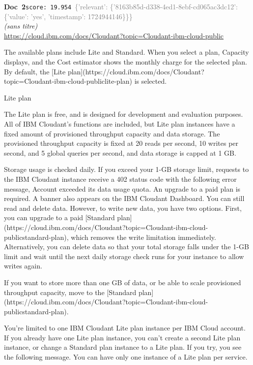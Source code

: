 \documentclass[a4paper,11pt]{article}
\begin{document}
\begin{docenv}
{\footnotesize\textcolor{doccolor}{\textbf{Doc~2}}}\hfill{\tiny\texttt{score:~19.954}}\ {\tiny\textcolor{gray}{\{'relevant': \{'8163b85d-d338-4ed1-8ebf-cd065ac3dc12': \{'value': 'yes', 'timestamp': 1724944146\}\}\}}}\\[3pt]
{\small\textit{(sans titre)}}\\[2pt]
{\tiny\url{https://cloud.ibm.com/docs/Cloudant?topic=Cloudant-ibm-cloud-public}}\\[4pt]
{\footnotesize 
The available plans include Lite and Standard. When you select a plan, Capacity displays, and the Cost estimator shows the monthly charge for the selected plan. By default, the [Lite plan](https://cloud.ibm.com/docs/Cloudant?topic=Cloudant-ibm-cloud-publiclite-plan) is selected.



 Lite plan 

The Lite plan is free, and is designed for development and evaluation purposes. All of IBM Cloudant's functions are included, but Lite plan instances have a fixed amount of provisioned throughput capacity and data storage. The provisioned throughput capacity is fixed at 20 reads per second, 10 writes per second, and 5 global queries per second, and data storage is capped at 1 GB.

Storage usage is checked daily. If you exceed your 1-GB storage limit, requests to the IBM Cloudant instance receive a 402 status code with the following error message, Account exceeded its data usage quota. An upgrade to a paid plan is required. A banner also appears on the IBM Cloudant Dashboard. You can still read and delete data. However, to write new data, you have two options. First, you can upgrade to a paid [Standard plan](https://cloud.ibm.com/docs/Cloudant?topic=Cloudant-ibm-cloud-publicstandard-plan), which removes the write limitation immediately. Alternatively, you can delete data so that your total storage falls under the 1-GB limit and wait until the next daily storage check runs for your instance to allow writes again.

If you want to store more than one GB of data, or be able to scale provisioned throughput capacity, move to the [Standard plan](https://cloud.ibm.com/docs/Cloudant?topic=Cloudant-ibm-cloud-publicstandard-plan).

You're limited to one IBM Cloudant Lite plan instance per IBM Cloud account. If you already have one Lite plan instance, you can't create a second Lite plan instance, or change a Standard plan instance to a Lite plan. If you try, you see the following message. You can have only one instance of a Lite plan per service.}
\end{docenv}
\end{document}
